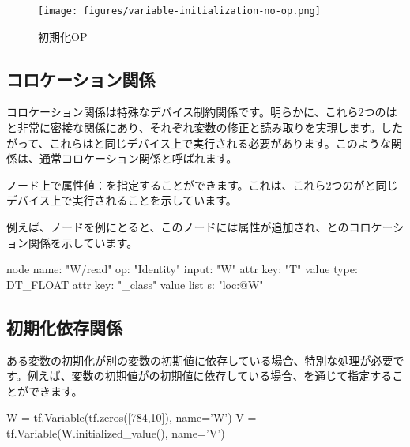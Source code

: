 \begin{content}
\begin{figure}[!h]
\centering
\texttt{[image: figures/variable-initialization-no-op.png]}
\caption{初期化OP}
 \label{fig:variable-initialization-no-op}
\end{figure}

\subsection{コロケーション関係}

コロケーション関係は特殊なデバイス制約関係です。明らかに、これら2つのはと非常に密接な関係にあり、それぞれ変数の修正と読み取りを実現します。したがって、これらはと同じデバイス上で実行される必要があります。このような関係は、通常コロケーション関係と呼ばれます。

ノード上で属性値：\code{[s: "loc:@W"]}を指定することができます。これは、これら2つのがと同じデバイス上で実行されることを示しています。

例えば、ノードを例にとると、このノードには属性が追加され、とのコロケーション関係を示しています。

\begin{leftbar}
\begin{python}
node {
  name: "W/read"
  op: "Identity"
  input: "W"
  attr {
    key: "T"
    value {
      type: DT_FLOAT
    }
  }
  attr {
    key: "_class"
    value {
      list {
        s: "loc:@W"
      }
    }
  }
}
\end{python}
\end{leftbar}

\subsection{初期化依存関係}

ある変数の初期化が別の変数の初期値に依存している場合、特別な処理が必要です。例えば、変数の初期値がの初期値に依存している場合、を通じて指定することができます。

\begin{leftbar}
\begin{python}
W = tf.Variable(tf.zeros([784,10]), name='W')
V = tf.Variable(W.initialized_value(), name='V')
\end{python}
\end{leftbar}


\end{content}
